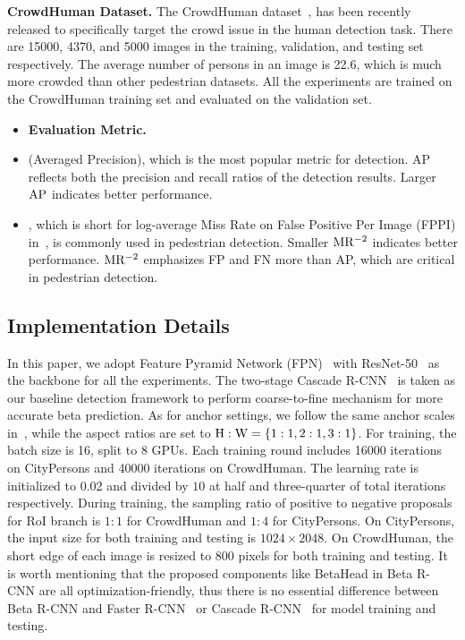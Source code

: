 \documentclass{article}
\begin{document}
\textbf{CrowdHuman Dataset.} 
The CrowdHuman dataset~\cite{crowdhuman}, has been recently released to specifically target the crowd issue in the human detection task.
There are 15000, 4370, and 5000 images in the training, validation, and testing set respectively. 
The average number of persons in an image is 22.6, which is much more crowded than other pedestrian datasets. 
All the experiments are trained on the CrowdHuman training set and evaluated on the validation set.


\begin{itemize}[leftmargin=0pt]
    \setlength{\itemsep}{0pt}
    \setlength{\parsep}{0pt}
    \setlength{\parskip}{0pt}
    \item[]{\textbf{Evaluation Metric.}}
    \item[]  (Averaged Precision), which is the most popular metric for detection. AP reflects both the precision and recall ratios of the detection results. 
    Larger $\rm AP$ indicates better performance.
    \item[] , which is short for log-average Miss Rate on False Positive Per Image (FPPI) in~\cite{metric}, is commonly used in pedestrian detection.
Smaller $\rm MR^{-2}$ indicates better performance.
    $\rm MR^{-2}$ emphasizes FP and FN more than AP, which are critical in pedestrian detection.
\end{itemize}

\subsection{Implementation Details}
\label{implementation}
In this paper, we adopt Feature Pyramid Network (FPN)~\cite{fpn} with ResNet-50~\cite{resnet} as the backbone for all the experiments. 
The two-stage Cascade R-CNN~\cite{cascadercnn} is taken as our baseline detection framework to perform coarse-to-fine mechanism for more accurate beta prediction. 
As for anchor settings, we follow the same anchor scales in~\cite{fpn}, while the aspect ratios are set to $\rm H:W=\{1:1, 2:1, 3:1\}$.
For training, the batch size is 16, split to 8 GPUs.
Each training round includes 16000 iterations on CityPersons and 40000 iterations on CrowdHuman.
The learning rate is initialized to 0.02 and divided by $10$ at half and three-quarter of total iterations respectively.
During training, the sampling ratio of positive to negative proposals for RoI branch is $1 : 1$ for CrowdHuman and $1 : 4$ for CityPersons.
On CityPersons, the input size for both training and testing is $1024\times 2048$.
On CrowdHuman, the short edge of each image is resized to 800 pixels for both training and testing. 
It is worth mentioning that the proposed components like BetaHead in Beta R-CNN are all optimization-friendly, thus there is no essential difference between Beta R-CNN and Faster R-CNN~\cite{faster} or Cascade R-CNN~\cite{cascadercnn} for model training and testing.
\end{document}
